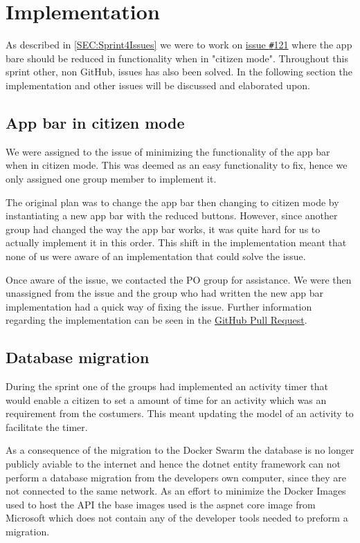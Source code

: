 \section{Implementation}
As described in \autoref{SEC:Sprint4Issues} we were to work on \href{https://github.com/aau-giraf/weekplanner/issues/121}{issue \texttt{\#}121} where the app bare should be reduced in functionality when in "citizen mode". 
Throughout this sprint other, non GitHub, issues has also been solved.
In the following section the implementation and other issues will be discussed and elaborated upon.

\subsection{App bar in citizen mode}
We were assigned to the issue of minimizing the functionality of the app bar when in citizen mode. 
This was deemed as an easy functionality to fix, hence we only assigned one group member to implement it. 

The original plan was to change the app bar then changing to citizen mode by instantiating a new app bar with the reduced buttons. 
However, since another group had changed the way the app bar works, it was quite hard for us to actually implement it in this order.
This shift in the implementation meant that none of us were aware of an implementation that could solve the issue. 

Once aware of the issue, we contacted the PO group for assistance. 
We were then unassigned from the issue and the group who had written the new app bar implementation had a quick way of fixing the issue. 
Further information regarding the implementation can be seen in the \href{https://github.com/aau-giraf/weekplanner/pull/262}{GitHub Pull Request}.

\subsection{Database migration}
During the sprint one of the groups had implemented an activity timer that would enable a citizen to set a amount of time for an activity which was an requirement from the costumers.
This meant updating the model of an activity to facilitate the timer. 

As a consequence of the migration to the Docker Swarm the database is no longer publicly aviable to the internet and hence the dotnet entity framework can not perform a database migration from the developers own computer, since they are not connected to the same network. 
As an effort to minimize the Docker Images used to host the API the base images used is the aspnet core image from Microsoft which does not contain any of the developer tools needed to preform a migration. 

